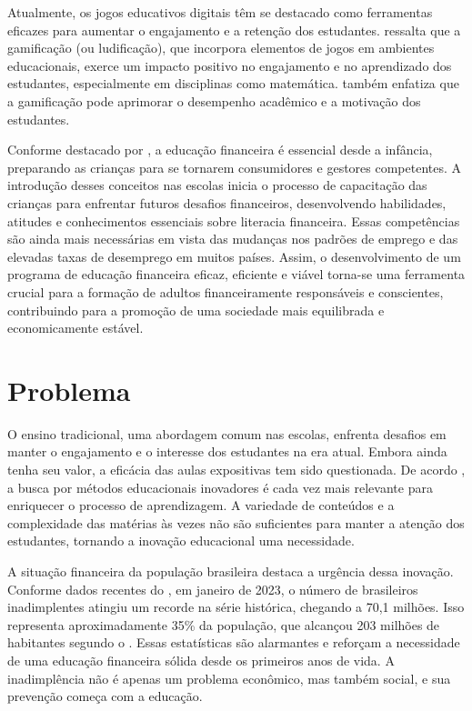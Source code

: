 Atualmente, os jogos educativos digitais têm se destacado como ferramentas eficazes para aumentar o engajamento e a retenção dos estudantes. \cite{lee2023} ressalta que a gamificação (ou ludificação), que incorpora elementos de jogos em ambientes educacionais, exerce um impacto positivo no engajamento e no aprendizado dos estudantes, especialmente em disciplinas como matemática. \cite{dahalan2023} também enfatiza que a gamificação pode aprimorar o desempenho acadêmico e a motivação dos estudantes.

Conforme destacado por \cite{masnan2016financial}, a educação financeira é essencial desde a infância, preparando as crianças para se tornarem consumidores e gestores competentes. A introdução desses conceitos nas escolas inicia o processo de capacitação das crianças para enfrentar futuros desafios financeiros, desenvolvendo habilidades, atitudes e conhecimentos essenciais sobre literacia financeira. Essas competências são ainda mais necessárias em vista das mudanças nos padrões de emprego e das elevadas taxas de desemprego em muitos países. Assim, o desenvolvimento de um programa de educação financeira eficaz, eficiente e viável torna-se uma ferramenta crucial para a formação de adultos financeiramente responsáveis e conscientes, contribuindo para a promoção de uma sociedade mais equilibrada e economicamente estável.


\section{Problema}

O ensino tradicional, uma abordagem comum nas escolas, enfrenta desafios em manter o engajamento e o interesse dos estudantes na era atual. Embora ainda tenha seu valor, a eficácia das aulas expositivas tem sido questionada. De acordo \cite{fortes2023aprendizagem}, a busca por métodos educacionais inovadores é cada vez mais relevante para enriquecer o processo de aprendizagem. A variedade de conteúdos e a complexidade das matérias às vezes não são suficientes para manter a atenção dos estudantes, tornando a inovação educacional uma necessidade.

A situação financeira da população brasileira destaca a urgência dessa inovação. Conforme dados recentes do \cite{SERASA_2023}, em janeiro de 2023, o número de brasileiros inadimplentes atingiu um recorde na série histórica, chegando a 70,1 milhões. Isso representa aproximadamente 35\% da população, que alcançou 203 milhões de habitantes segundo o \cite{IBGE_Censo_2022}. Essas estatísticas são alarmantes e reforçam a necessidade de uma educação financeira sólida desde os primeiros anos de vida. A inadimplência não é apenas um problema econômico, mas também social, e sua prevenção começa com a educação.

